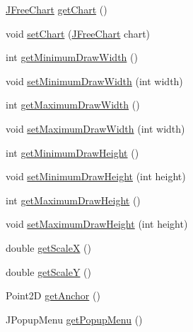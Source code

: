 \begin{DoxyCompactItemize}
\item 
\mbox{\hyperlink{classorg_1_1jfree_1_1chart_1_1_j_free_chart}{J\+Free\+Chart}} \mbox{\hyperlink{classorg_1_1jfree_1_1chart_1_1_chart_panel_adf0ff69cc6b6683073d2c458617b3e47}{get\+Chart}} ()
\item 
void \mbox{\hyperlink{classorg_1_1jfree_1_1chart_1_1_chart_panel_a56e3f287b3d61074287004c832216f76}{set\+Chart}} (\mbox{\hyperlink{classorg_1_1jfree_1_1chart_1_1_j_free_chart}{J\+Free\+Chart}} chart)
\item 
int \mbox{\hyperlink{classorg_1_1jfree_1_1chart_1_1_chart_panel_a59eb1e41f4bce283e166a781da9a2a01}{get\+Minimum\+Draw\+Width}} ()
\item 
void \mbox{\hyperlink{classorg_1_1jfree_1_1chart_1_1_chart_panel_aaedb4c6e3dde4e6bacbb5dd8295cf809}{set\+Minimum\+Draw\+Width}} (int width)
\item 
int \mbox{\hyperlink{classorg_1_1jfree_1_1chart_1_1_chart_panel_a9b32dd4ce124173e59d256f9e1d77ef8}{get\+Maximum\+Draw\+Width}} ()
\item 
void \mbox{\hyperlink{classorg_1_1jfree_1_1chart_1_1_chart_panel_a245128d93b552e3f887641b661dfa495}{set\+Maximum\+Draw\+Width}} (int width)
\item 
int \mbox{\hyperlink{classorg_1_1jfree_1_1chart_1_1_chart_panel_a8976864e565b7faaa132d044d5559b47}{get\+Minimum\+Draw\+Height}} ()
\item 
void \mbox{\hyperlink{classorg_1_1jfree_1_1chart_1_1_chart_panel_ab2c58f9c8cd3d353b443aa11c161280f}{set\+Minimum\+Draw\+Height}} (int height)
\item 
int \mbox{\hyperlink{classorg_1_1jfree_1_1chart_1_1_chart_panel_a7ae12cf78fcd721b6cdcf4eda1b5fd3a}{get\+Maximum\+Draw\+Height}} ()
\item 
void \mbox{\hyperlink{classorg_1_1jfree_1_1chart_1_1_chart_panel_a1c479d1166162b36192b573104f4c827}{set\+Maximum\+Draw\+Height}} (int height)
\item 
double \mbox{\hyperlink{classorg_1_1jfree_1_1chart_1_1_chart_panel_afafa2053d0e1e22fc5d4de6ad04bc82e}{get\+ScaleX}} ()
\item 
double \mbox{\hyperlink{classorg_1_1jfree_1_1chart_1_1_chart_panel_aa5aff48954f7f9f4bb1cd78fd84f5ab7}{get\+ScaleY}} ()
\item 
Point2D \mbox{\hyperlink{classorg_1_1jfree_1_1chart_1_1_chart_panel_a26fbc127ad0dbbe82c7b3dfabbc7ca1f}{get\+Anchor}} ()
\item 
J\+Popup\+Menu \mbox{\hyperlink{classorg_1_1jfree_1_1chart_1_1_chart_panel_a1486b59777a5870a8a0b7a1b42bab69c}{get\+Popup\+Menu}} ()

\end{DoxyCompactItemize}
